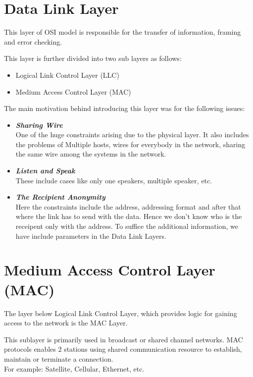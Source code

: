 \documentclass[12pt]{article}
\begin{document}
\maketitle

\section{Data Link Layer}
This layer of OSI model is responsible for the transfer of information, framing and error checking.

This layer is further divided into two sub layers as follows:
    \begin{itemize}
        \item Logical Link Control Layer (LLC)
        \item Medium Access Control Layer (MAC)
    \end{itemize}

The main motivation behind introducing this layer was for the following issues:
\begin{itemize}
    \item \textbf{\textit{Sharing Wire}} \\
    One of the huge constraints arising due to the physical layer. It also includes the problems of Multiple hosts, wires for everybody in the network, sharing the same wire among the systems in the network.
    \item \textbf{\textit{Listen and Speak}} \\
    These include cases like only one speakers, multiple speaker, etc.
    \item \textbf{\textit{The Recipient Anonymity}} \\
    Here the constraints include the address, addressing format and after that where the link has to send with the data. Hence we don't know who is the receipent only with the address. To suffice the additional information, we have include parameters in the Data Link Layers.
\end{itemize}

\section{Medium Access Control Layer (MAC)}
The layer below Logical Link Control Layer, which provides logic for gaining access to the network is the MAC Layer.

This sublayer is primarily used in broadcast or shared channel networks. MAC protocols enables 2 stations using shared communication resource to establish, maintain or terminate a connection. \\
For example: Satellite, Cellular, Ethernet, etc.
\end{document}
